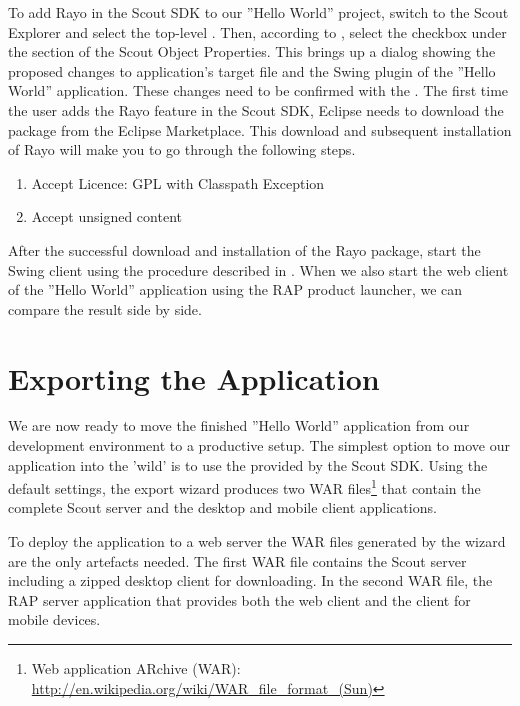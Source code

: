 \documentclass[a4paper,10pt,twoside]{book}
\begin{document}
To add Rayo in the Scout SDK to our ''Hello World'' project, switch to the Scout Explorer and select the top-level .
Then, according to , select the checkbox  under the  section of the Scout Object Properties.
This brings up a dialog showing the proposed changes to application's target file and the Swing plugin of the ''Hello World'' application. 
These changes need to be confirmed with the .
The first time the user adds the Rayo feature in the Scout SDK, Eclipse needs to download the package from the Eclipse Marketplace.
This download and subsequent installation of Rayo will make you to go through the following steps.

\begin{enumerate}
  \item Accept Licence: GPL with Classpath Exception
  \item Accept unsigned content
\end{enumerate}

After the successful download and installation of the Rayo package, start the Swing client using the procedure described in .
When we also start the web client of the ''Hello World'' application using the RAP product launcher, we can compare the result side by side.

\section{Exporting the Application}

We are now ready to move the finished ''Hello World'' application from our development environment to a productive setup.
The simplest option to move our application into the 'wild' is to use the  provided by the Scout SDK.
Using the default settings, the export wizard produces two WAR files\footnote{
Web application ARchive (WAR): \url{http://en.wikipedia.org/wiki/WAR_file_format_(Sun)}
}
that contain the complete Scout server and the desktop and mobile client applications.

To deploy the application to a web server the WAR files generated by the wizard are the only artefacts needed.
The first WAR file contains the Scout server including a zipped desktop client for downloading.
In the second WAR file, the RAP server application that provides both the web client and the client for mobile devices.
\end{document}
